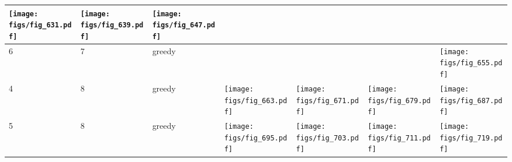 \documentclass[oneside,canadian,landscape]{article}
\begin{document}
\begin{center}
\begin{longtable}{|l|l|l||l|l|l|l|}
\begin{minipage}{3.5cm}
\texttt{[image: figs/fig\_631.pdf]}
\end{minipage}
&\begin{minipage}{3.5cm}
\texttt{[image: figs/fig\_639.pdf]}
\end{minipage}
&\begin{minipage}{3.5cm}
\texttt{[image: figs/fig\_647.pdf]}
\end{minipage}
\\ \hline
6&7&greedy&&&&\begin{minipage}{3.5cm}
\texttt{[image: figs/fig\_655.pdf]}
\end{minipage}
\\ \hline
4&8&greedy&\begin{minipage}{3.5cm}
\texttt{[image: figs/fig\_663.pdf]}
\end{minipage}
&\begin{minipage}{3.5cm}
\texttt{[image: figs/fig\_671.pdf]}
\end{minipage}
&\begin{minipage}{3.5cm}
\texttt{[image: figs/fig\_679.pdf]}
\end{minipage}
&\begin{minipage}{3.5cm}
\texttt{[image: figs/fig\_687.pdf]}
\end{minipage}
\\ \hline
5&8&greedy&\begin{minipage}{3.5cm}
\texttt{[image: figs/fig\_695.pdf]}
\end{minipage}
&\begin{minipage}{3.5cm}
\texttt{[image: figs/fig\_703.pdf]}
\end{minipage}
&\begin{minipage}{3.5cm}
\texttt{[image: figs/fig\_711.pdf]}
\end{minipage}
&\begin{minipage}{3.5cm}
\texttt{[image: figs/fig\_719.pdf]}
\end{minipage}
\\ \hline
\end{longtable}
\end{center}
\end{document}
